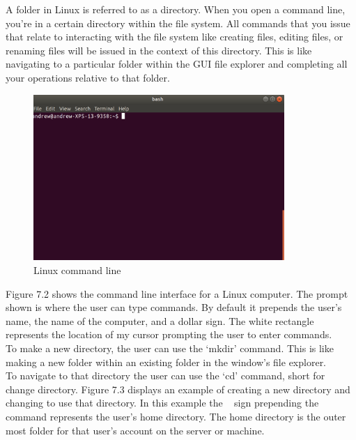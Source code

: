   A folder in Linux is referred to as a directory. When you open a command line, you’re in a certain directory within the file system. All commands that you issue that relate to interacting with the file system like creating files, editing files, or renaming files will be issued in the context of this directory. This is like navigating to a particular folder within the GUI file explorer and completing all your operations relative to that folder. 

\begin{figure}
	\centering
	\includegraphics[width=0.85\textwidth]{images/commandLineOne.png}
	\caption{Linux command line}
	\label{fig:linux:one}
\end{figure}

Figure 7.2 shows the command line interface for a Linux computer. The prompt shown is where the user can type commands. By default it prepends the user’s name, the name of the computer, and a dollar sign. The white rectangle represents the location of my cursor prompting the user to enter commands. \\

To make a new directory, the user can use the ‘mkdir’ command. This is like making a new folder within an existing folder in the window’s file explorer. \\

To navigate to that directory the user can use the ‘cd’ command, short for change directory. Figure 7.3 displays an example of creating a new directory and changing to use that directory. In this example the ~ sign prepending the command represents the user’s home directory. The home directory is the outer most folder for that user’s account on the server or machine. \\

